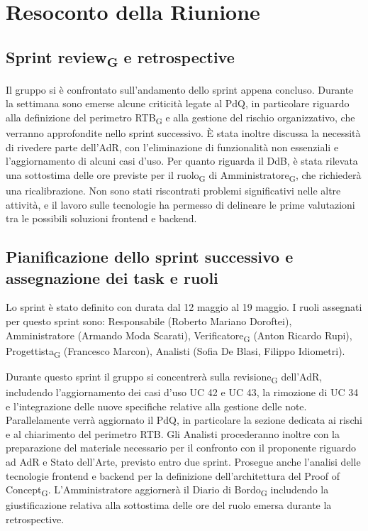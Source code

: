 \section{Resoconto della Riunione}

\subsection{Sprint review\textsubscript{G} e retrospective}
Il gruppo si è confrontato sull’andamento dello
sprint appena concluso. Durante la settimana sono 
emerse alcune criticità legate al PdQ, in particolare 
riguardo alla definizione del perimetro RTB\textsubscript{G} e alla 
gestione del rischio organizzativo, che verranno 
approfondite nello sprint successivo. È stata inoltre 
discussa la necessità di rivedere parte dell’AdR, con 
l’eliminazione di funzionalità non essenziali e 
l’aggiornamento di alcuni casi d’uso. Per quanto 
riguarda il DdB, è stata rilevata una sottostima 
delle ore previste per il ruolo\textsubscript{G} di Amministratore\textsubscript{G}, 
che richiederà una ricalibrazione. Non sono stati 
riscontrati problemi significativi nelle altre attività, 
e il lavoro sulle tecnologie ha permesso di 
delineare le prime valutazioni tra le possibili soluzioni 
frontend e backend.


\subsection{Pianificazione dello sprint successivo e assegnazione dei task e ruoli}
Lo sprint è stato definito con durata dal 12 maggio al 19 maggio. I ruoli assegnati per questo sprint sono: 
Responsabile (Roberto Mariano Doroftei), Amministratore (Armando Moda Scarati), Verificatore\textsubscript{G} (Anton Ricardo Rupi), 
Progettista\textsubscript{G} (Francesco Marcon), Analisti (Sofia De Blasi, Filippo Idiometri).

Durante questo sprint il gruppo si concentrerà sulla 
revisione\textsubscript{G} dell’AdR, includendo l’aggiornamento dei 
casi d’uso UC 42 e UC 43, la rimozione di UC 34 e 
l’integrazione delle nuove specifiche relative alla 
gestione delle note. Parallelamente verrà aggiornato il 
PdQ, in particolare la sezione dedicata ai rischi e al 
chiarimento del perimetro RTB. Gli Analisti procederanno 
inoltre con la preparazione del materiale necessario per 
il confronto con il proponente riguardo ad AdR e Stato 
dell’Arte, previsto entro due sprint. Prosegue anche 
l’analisi delle tecnologie frontend e backend per la 
definizione dell’architettura del Proof of Concept\textsubscript{G}. 
L’Amministratore aggiornerà il Diario di Bordo\textsubscript{G} includendo 
la giustificazione relativa alla sottostima delle ore 
del ruolo emersa durante la retrospective.



